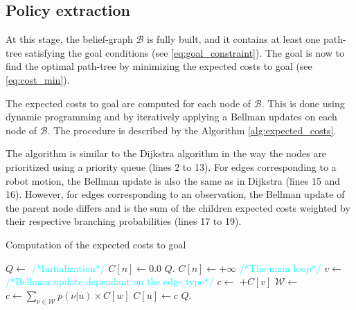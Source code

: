 \documentclass[letterpaper, 10 pt, conference]{ieeeconf}  %
\begin{document}
\subsection{Policy extraction}

At this stage, the belief-graph $\mathcal{B}$ is fully built, and it contains at least one path-tree satisfying the goal conditions (see \ref{eq:goal_constraint}). The goal is now to find the optimal path-tree by minimizing the expected costs to goal (see \ref{eq:cost_min}).

The expected costs to goal are computed for each node of $\mathcal{B}$. This is done using dynamic programming and by iteratively applying a Bellman updates on each node of $\mathcal{B}$.
The procedure is described by the Algorithm \ref{alg:expected_costs}.

The algorithm is similar to the Dijkstra algorithm \cite{Sniedovich2006DijkstrasAR} in the way the nodes are prioritized using a priority queue (lines 2 to 13). For edges corresponding to a robot motion, the Bellman update is also the same as in Dijkstra (lines 15 and 16). However, for edges corresponding to an observation, the Bellman update of the parent node differs and is the sum of the children expected costs weighted by their respective branching probabilities (lines 17 to 19).
\begin{algorithm}[H]
\caption{Computation of the expected costs to goal}
\label{alg:expected_costs}
\begin{algorithmic}[1]
	\State $Q \gets $ 
	\State \textcolor{cyan}{\footnotesize/*Initialization*/}
			\State $C[n] \gets 0.0$
			\State $Q$.
		\Else
			\State $C[n] \gets +\infty$
		\EndIf
	\EndFor
	\State \textcolor{cyan}{\footnotesize/*The main loop*/}
		\State $v \gets$ 
			\State \textcolor{cyan}{\footnotesize/*Bellman update dependant on the edge type*/}
				\State $c \gets$ $+ C[v]$
				\State $\mathcal{W} \gets $ 
				\State $c \gets \sum_{\nu \in \mathcal{W}}{ p(\nu | u) \times C[w]} $
			\EndIf
				\State $C[u] \gets c$
				\State $Q$.
			\EndIf
		\EndFor
	\EndWhile
\EndFunction
\end{algorithmic}
\end{algorithm}
\end{document}
